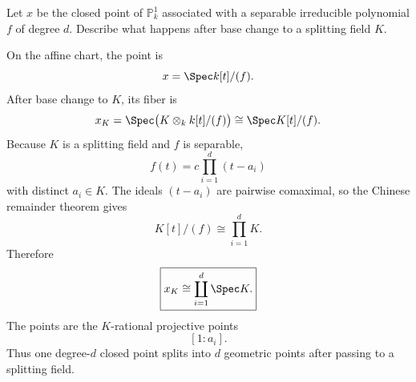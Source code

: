 \begin{problem}\label{prob:vi36-06}
Let \(x\) be the closed point of \(\mathbb P^1_k\) associated with a separable irreducible polynomial \(f\) of degree \(d\). Describe what happens after base change to a splitting field \(K\).
\end{problem}

\ifdefined\FullProblemDossiers
\begin{solution}
On the affine chart, the point is
\[
x=\Spec k[t]/(f).
\]
After base change to \(K\), its fiber is
\[
x_K
=
\Spec\bigl(K\otimes_k k[t]/(f)\bigr)
\cong
\Spec K[t]/(f).
\]
Because \(K\) is a splitting field and \(f\) is separable,
\[
f(t)=c\prod_{i=1}^d(t-a_i)
\]
with distinct \(a_i\in K\). The ideals \((t-a_i)\) are pairwise comaximal, so the Chinese remainder theorem gives
\[
K[t]/(f)
\cong
\prod_{i=1}^dK.
\]
Therefore
\[
\boxed{
x_K\cong\coprod_{i=1}^d\Spec K.
}
\]
The points are the \(K\)-rational projective points
\[
\boxed{[1:a_i]}.
\]
Thus one degree-\(d\) closed point splits into \(d\) geometric points after passing to a splitting field.
\end{solution}
\fi
